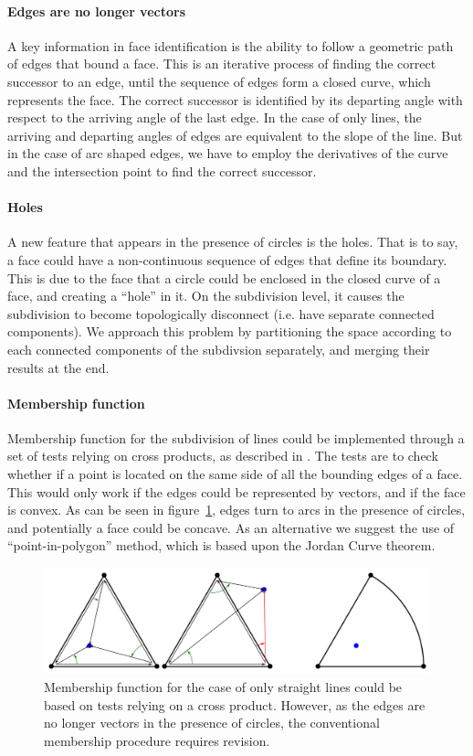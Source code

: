 \paragraph{Edges are no longer vectors}
A key information in face identification is the ability to follow a geometric path of edges that bound a face.
This is an iterative process of finding the correct successor to an edge, until the sequence of edges form a closed curve, which represents the face.
The correct successor is identified by its departing angle with respect to the arriving angle of the last edge.
In the case of only lines, the arriving and departing angles of edges are equivalent to the slope of the line.
But in the case of arc shaped edges, we have to employ the derivatives of the curve and the intersection point to find the correct successor.

\paragraph{Holes}
A new feature that appears in the presence of circles is the holes.
That is to say, a face could have a non-continuous sequence of edges that define its boundary.
This is due to the face that a circle could be enclosed in the closed curve of a face, and creating a ``hole'' in it.
On the subdivision level, it causes the subdivision to become topologically disconnect (i.e. have separate connected components).
We approach this problem by partitioning the space according to each connected components of the subdivsion separately, and merging their results at the end.

\paragraph{Membership function}
Membership function for the subdivision of lines could be implemented through a set of tests relying on cross products, as described in \cite{de2000computational}.
The tests are to check whether if a point is located on the same side of all the bounding edges of a face.
This would only work if the edges could be represented by vectors, and if the face is convex.
As can be seen in figure~\ref{fig:intro_crossProdFail}, edges turn to arcs in the presence of circles, and potentially a face could be concave.
As an alternative we suggest the use of ``point-in-polygon'' method, which is based upon the Jordan Curve theorem.

\begin{figure} %
    \centering
    \includegraphics[width=1.\textwidth]{figures/intro_crossProdFail.png}
    \caption{Membership function for the case of only straight lines could be based on tests relying on a cross product.
    However, as the edges are no longer vectors in the presence of circles, the conventional membership procedure requires revision.}
    \label{fig:intro_crossProdFail}
\end{figure}
